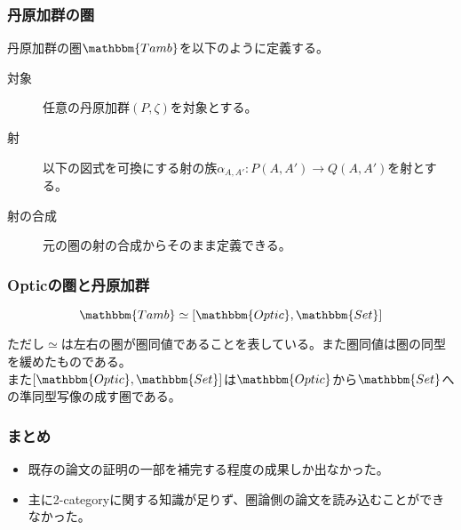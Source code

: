 \documentclass[uplatex,dvipdfmx]{beamer}
\newcommand{\cat}[1]{\mathbbm{#1}}
\newcommand{\arrow}{\rightarrow}
\newcommand{\mor}[3]{#1:#2\arrow #3}
\newcommand{\incat}[2]{[\cat{#1},\cat{#2}]}
\begin{document}
  \begin{frame}
    \frametitle{丹原加群の圏}
    \begin{definition}[丹原加群の圏]
      丹原加群の圏$\cat{Tamb}$を以下のように定義する。
      {\small
      \begin{description}
        \item[対象] 任意の丹原加群$(P,\zeta)$を対象とする。
        \item[射] 以下の図式を可換にする射の族$\mor{\alpha_{A,A'}}{P(A,A')}{Q(A,A')}$を射とする。\\
        {\tiny
          }
        \item[射の合成] 元の圏の射の合成からそのまま定義できる。
      \end{description}
      }
    \end{definition}
  \end{frame}
  \begin{frame}
    \frametitle{Opticの圏と丹原加群}
    \begin{theorem}
      \[\cat{Tamb}\simeq\incat{Optic}{Set}\]
    \end{theorem}
    ただし$\simeq$は左右の圏が圏同値であることを表している。また圏同値は圏の同型を緩めたものである。\\
    \vspace{\baselineskip}
    また$\incat{Optic}{Set}$は$\cat{Optic}$から$\cat{Set}$への準同型写像の成す圏である。  
  \end{frame}
  \begin{frame}
    \frametitle{まとめ}
    \begin{itemize}
      \item 既存の論文の証明の一部を補完する程度の成果しか出なかった。
      \item 主に2-categoryに関する知識が足りず、圏論側の論文を読み込むことができなかった。
    \end{itemize}
  \end{frame}
\end{document}
